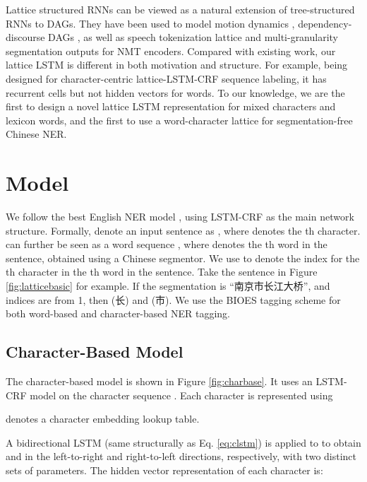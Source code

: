 \documentclass[11pt,a4paper]{article}
\begin{document}
\begin{CJK*}{UTF8}{gbsn}
Lattice structured RNNs can be viewed as a natural extension of tree-structured RNNs \cite{tai-socher-manning:2015:ACL-IJCNLP} to DAGs. They have been used to model motion dynamics \cite{Sun_2017_ICCV}, dependency-discourse DAGs \cite{DBLP:journals/tacl/PengPQTY17}, as well as speech tokenization lattice \cite{sperber-EtAl:2017:EMNLP2017} and multi-granularity segmentation outputs \cite{DBLP:conf/aaai/SuTXJSL17} for NMT encoders. Compared with existing work, our lattice LSTM is different in both motivation and structure. For example, being designed for character-centric lattice-LSTM-CRF sequence labeling, it has recurrent cells but not hidden vectors for words. To our knowledge, we are the first to design a novel lattice LSTM representation for mixed characters and lexicon words, and the first to use a word-character lattice for segmentation-free Chinese NER.



\section{Model}

We follow the best English NER model \cite{huang2015bidirectional,ma2016end,lample2016neural}, using LSTM-CRF as the main network structure. Formally, denote an input sentence as , where  denotes the th character.  can further be seen as a word sequence , where  denotes the th word in the sentence, obtained using a Chinese segmentor.  We use  to denote the index  for the th character in the th word in the sentence. Take the sentence in Figure \ref{fig:latticebasic} for example. If the segmentation is ``南京市\;\;长江大桥'', and indices are from 1, then  (长) and  (市). We use the BIOES tagging scheme \cite{ratinov2009design} for both word-based and character-based NER tagging.



\subsection{Character-Based Model}\label{sec:charmodel}
The character-based model is shown in Figure \ref{fig:charbase}. It uses an LSTM-CRF model on the character sequence . Each character  is represented using

 denotes a character embedding lookup table. 

A bidirectional LSTM (same structurally as Eq. \ref{eq:clstm}) is applied to  to obtain  and  in the left-to-right and right-to-left directions, respectively, with two distinct sets of parameters. The hidden vector representation of each character is:



\end{CJK*}
\end{document}
